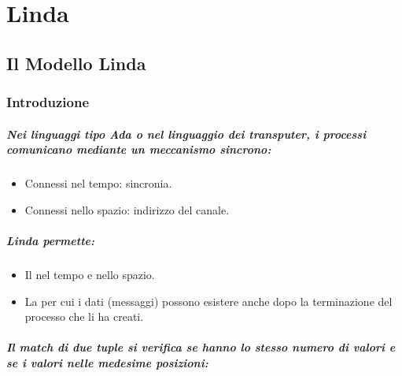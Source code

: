 \chapter{Linda}

\section{Il Modello Linda}

\subsection{Introduzione}

\paragraph{Nei linguaggi tipo Ada o nel linguaggio dei transputer, i processi comunicano mediante un meccanismo sincrono:}

\begin{itemize}
	\item Connessi nel tempo: sincronia.
	\item Connessi nello spazio: indirizzo del canale.
\end{itemize}

\paragraph{Linda permette:}

\begin{itemize}
	\item Il  nel tempo e nello spazio.
	\item La  per cui i dati (messaggi) possono esistere anche dopo la terminazione del processo che li ha creati.
\end{itemize}



\paragraph{Il match di due tuple si verifica se hanno lo stesso numero di valori e se i
	valori nelle medesime posizioni:}


